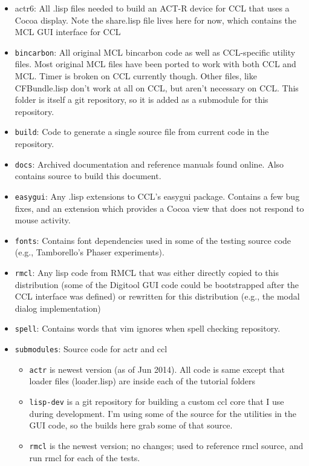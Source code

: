 \documentclass[12pt]{article} %
\newcommand{\filesys}[1]{\texttt{#1}}
\begin{document}
\begin{itemize}
  \item actr6: All .lisp files needed to build an ACT-R device for CCL that uses a Cocoa display. Note the share.lisp file lives here for now, which contains the MCL GUI interface for CCL
  \item \filesys{bincarbon}:
    All original MCL bincarbon code as well as CCL-specific utility files. 
    Most original MCL files have been ported to work with both CCL and MCL.
    Timer is broken on CCL currently though.
    Other files, like CFBundle.lisp don't work at all on CCL, but aren't necessary on CCL.
    This folder is itself a git repository, so it is added as a submodule for this repository.
  \item \filesys{build}: Code to generate a single source file from current code in the repository.
  \item \filesys{docs}:
    Archived documentation and reference manuals found online.
    Also contains source to build this document.
  \item \filesys{easygui}:
    Any .lisp extensions to CCL's easygui package.
    Contains a few bug fixes, and an extension which provides a Cocoa view that does not respond to mouse activity.
  \item \filesys{fonts}: Contains font dependencies used in some of the testing source code (e.g., Tamborello's Phaser experiments).
  \item \filesys{rmcl}:
    Any lisp code from RMCL that was either directly copied to this distribution (some of the Digitool GUI code could be bootstrapped after the CCL interface was defined)
    or rewritten for this distribution (e.g., the modal dialog implementation)
  \item \filesys{spell}: Contains words that vim ignores when spell checking repository.
  \item \filesys{submodules}: Source code for actr and ccl
    \begin{itemize}
      \item \filesys{actr} is newest version (as of Jun 2014). All code is same except that loader files (loader.lisp) are inside each of the tutorial folders
      \item \filesys{lisp-dev} is a git repository for building a custom ccl core that I use during development.
	I'm using some of the source for the utilities in the GUI code, so the builds here grab some of that source.
      \item \filesys{rmcl} is the newest version; no changes; used to reference rmcl source, and run rmcl for each of the tests.

\end{itemize}
\end{itemize}
\end{document}
